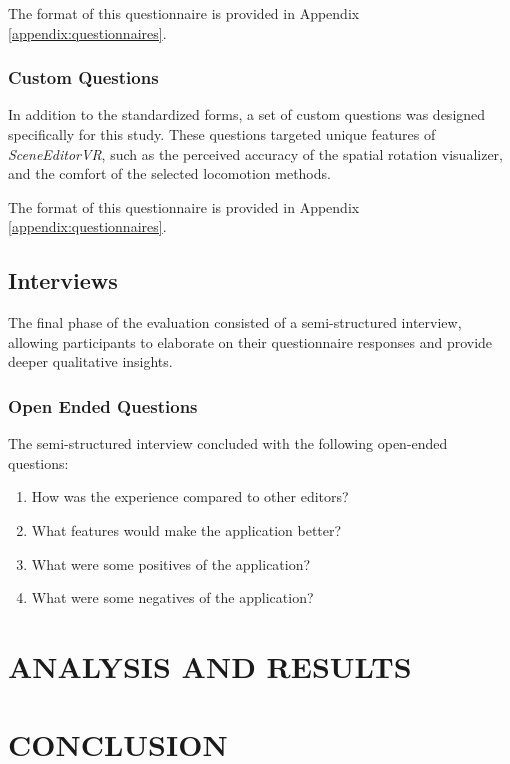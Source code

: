 \documentclass[inscr,ack,preface]{dithesis}
\begin{document}
The format of this questionnaire is provided in Appendix \ref{appendix:questionnaires}.


\subsection{Custom Questions}
In addition to the standardized forms, a set of custom questions was designed specifically for this study.
These questions targeted unique features of \textit{SceneEditorVR}, such as the perceived accuracy of the spatial rotation visualizer,
and the comfort of the selected locomotion methods.

The format of this questionnaire is provided in Appendix \ref{appendix:questionnaires}.


\section{Interviews}
The final phase of the evaluation consisted of a semi-structured interview, allowing participants to elaborate on their
questionnaire responses and provide deeper qualitative insights.

\subsection{Open Ended Questions}
The semi-structured interview concluded with the following open-ended questions:

\begin{enumerate}
  \item How was the experience compared to other editors?
  \item What features would make the application better?
  \item What were some positives of the application?
  \item What were some negatives of the application?
\end{enumerate}

\chapter{ANALYSIS AND RESULTS}


\chapter{CONCLUSION}

\end{document}
